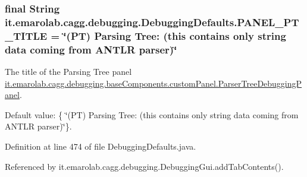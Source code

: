 \hypertarget{classit_1_1emarolab_1_1cagg_1_1debugging_1_1DebuggingDefaults_a3fc27081a3f93504822aa3a32de9e14e}{
\subsubsection[{P\-A\-N\-E\-L\-\_\-\-P\-T\-\_\-\-T\-I\-T\-L\-E}]{\setlength{\rightskip}{0pt plus 5cm}final String it.\-emarolab.\-cagg.\-debugging.\-Debugging\-Defaults.\-P\-A\-N\-E\-L\-\_\-\-P\-T\-\_\-\-T\-I\-T\-L\-E = \char`\"{}(P\-T) Parsing Tree\-: (this contains only string data coming from A\-N\-T\-L\-R parser)\char`\"{}\hspace{0.3cm}{\ttfamily [static]}}}\label{classit_1_1emarolab_1_1cagg_1_1debugging_1_1DebuggingDefaults_a3fc27081a3f93504822aa3a32de9e14e}
The title of the Parsing Tree panel \hyperlink{classit_1_1emarolab_1_1cagg_1_1debugging_1_1baseComponents_1_1customPanel_1_1ParserTreeDebuggingPanel}{it.\-emarolab.\-cagg.\-debugging.\-base\-Components.\-custom\-Panel.\-Parser\-Tree\-Debugging\-Panel}.\par
 Default value\-: \{ \char`\"{}(\-P\-T) Parsing Tree\-: (this contains only string data coming from A\-N\-T\-L\-R parser)\char`\"{}\}. 

Definition at line 474 of file Debugging\-Defaults.\-java.



Referenced by it.\-emarolab.\-cagg.\-debugging.\-Debugging\-Gui.\-add\-Tab\-Contents().

